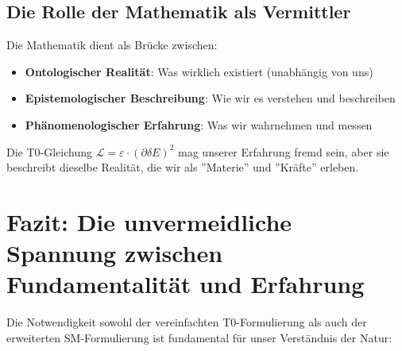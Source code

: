	\subsection{Die Rolle der Mathematik als Vermittler}
	
	\begin{tcolorbox}[colback=purple!5!white,colframe=purple!75!black,title=Mathematik als universelle Sprache]
		Die Mathematik dient als Brücke zwischen:
		\begin{itemize}
			\item \textbf{Ontologischer Realität}: Was wirklich existiert (unabhängig von uns)
			\item \textbf{Epistemologischer Beschreibung}: Wie wir es verstehen und beschreiben
			\item \textbf{Phänomenologischer Erfahrung}: Was wir wahrnehmen und messen
		\end{itemize}
		
		Die T0-Gleichung $\mathcal{L} = \varepsilon \cdot (\partial\delta E)^2$ mag unserer Erfahrung fremd sein, aber sie beschreibt dieselbe Realität, die wir als ''Materie'' und ''Kräfte'' erleben.
	\end{tcolorbox}
	
	\section{Fazit: Die unvermeidliche Spannung zwischen Fundamentalität und Erfahrung}
	
	Die Notwendigkeit sowohl der vereinfachten T0-Formulierung als auch der erweiterten SM-Formulierung ist fundamental für unser Verständnis der Natur:
	
